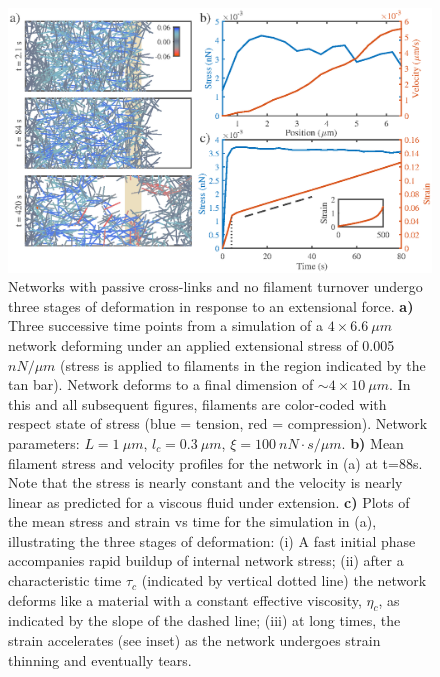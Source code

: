 \documentclass[10pt,letterpaper]{article}
\begin{document}
\begin{figure}[h!]
\centering
\includegraphics[width=\hsize]{figures/figure3a}
\caption{\label{fig:passive_ex}  Networks with passive cross-links and no filament turnover undergo three stages of deformation in response to an extensional force.   \textbf{a)} Three successive time points from a simulation of a $4\times6.6\: \mu m$ network deforming under an applied extensional stress of 0.005 $nN/\mu m$ (stress is applied to filaments in the region indicated by the tan bar). Network deforms to a final dimension of $\sim4\times10\: \mu m$. In this and all subsequent figures, filaments are color-coded with respect state of stress (blue = tension, red = compression).  Network parameters: $L=1\: \mu m$, $l_c=0.3\: \mu m$, $\xi=100\: nN\cdot s/\mu m$. \textbf{b)} Mean filament stress and velocity profiles for the  network in (a) at t=88s. Note that the stress is nearly constant and the velocity is nearly linear as predicted for a viscous fluid under extension.  \textbf{c)} Plots of the mean stress and strain vs time for the simulation in (a), illustrating the three stages of deformation: (i) A fast initial phase accompanies rapid buildup of internal network stress; (ii) after a characteristic time $\tau_c$ (indicated by vertical dotted line) the network deforms like a material with a constant effective viscosity, $\eta_c$, as indicated by the slope of the dashed line; (iii) at long times, the strain accelerates (see inset) as the network undergoes strain thinning and eventually tears. }
\end{figure}

\end{document}
